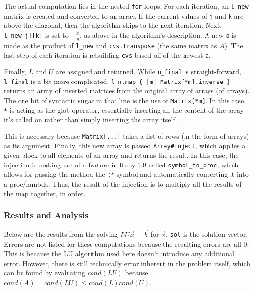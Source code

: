 \documentclass[letterpaper,12pt]{article}
\begin{document}
The actual computation lies in the nested \texttt{for} loops.
For each iteration, an \texttt{l\_new} matrix is created and converted to an
array.
If the current values of \texttt{j} and \texttt{k} are above the diagonal,
then the algorithm skips to the next iteration.
Next, \texttt{l\_new[j][k]} is set to $-\frac{x}{y}$, as above in the
algorithm's description.
A new \texttt{a} is made as the product of \texttt{l\_new} and
\texttt{cvs.transpose} (the same matrix as $A$).
The last step of each iteration is rebuilding \texttt{cvs} based off of the
newest \texttt{a}.

Finally, $L$ and $U$ are assigned and returned.
While \texttt{u\_final} is straight-forward, \texttt{l\_final} is a bit more
complicated.
\texttt{l\_n.map \{ |m| Matrix[*m].inverse \}} returns an array of inverted
matrices from the original array of arrays (of arrays).
The one bit of syntactic sugar in that line is the use of \texttt{Matrix[*m]}.
In this case, \texttt{*} is acting as the glob operator, essentially inserting
all the content of the array it's called on rather than simply inserting the
array itself.

This is necessary because \texttt{Matrix[...]} takes a list of rows (in the
form of arrays) as its argument.
Finally, this new array is passed \texttt{Array\#inject}, which applies a given
block to all elements of an array and returns the result.
In this case, the injection is making use of a feature in Ruby 1.9 called
\texttt{symbol\_to\_proc}, which allows for passing the method the \texttt{:*}
symbol and automatically converting it into a proc/lambda.
Thus, the result of the injection is to multiply all the results of the map
together, in order.
\\
\subsubsection{Results and Analysis}

Below are the results from the solving $LU\vec{x} = \vec{b}$ for $\vec{x}$.
\texttt{sol} is the solution vector.
Errors are not listed for these computations because the resulting errors are
all 0.
This is because the LU algorithm used here doesn't introduce any additional
error.
However, there is still technically error inherent in the problem itself,
which can be found by evaluating $cond{(LU)}$ because $cond(A) = cond(LU) \le cond(L) cond(U)$.
\end{document}
